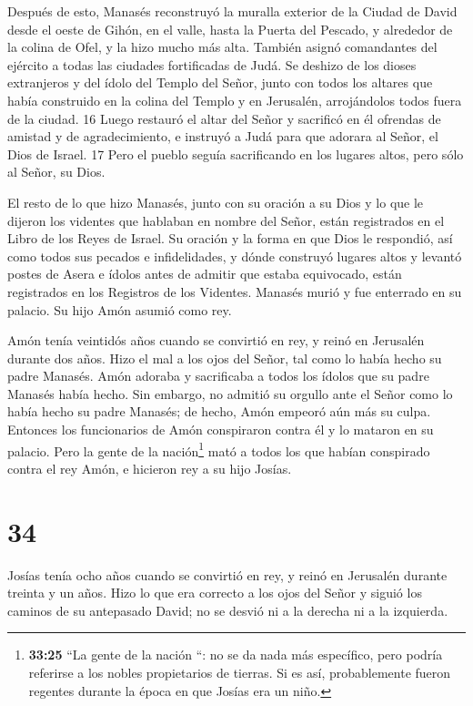  Después de esto, Manasés reconstruyó la muralla exterior
de la Ciudad de David desde el oeste de Gihón, en el valle, hasta la
Puerta del Pescado, y alrededor de la colina de Ofel, y la hizo mucho
más alta. También asignó comandantes del ejército a todas las ciudades
fortificadas de Judá.  Se deshizo de los dioses extranjeros
y del ídolo del Templo del Señor, junto con todos los altares que había
construido en la colina del Templo y en Jerusalén, arrojándolos todos
fuera de la ciudad. 16 Luego restauró el altar del Señor y sacrificó en
él ofrendas de amistad y de agradecimiento, e instruyó a Judá para que
adorara al Señor, el Dios de Israel. 17 Pero el pueblo seguía
sacrificando en los lugares altos, pero sólo al Señor, su Dios.

 El resto de lo que hizo Manasés, junto con su oración a su
Dios y lo que le dijeron los videntes que hablaban en nombre del Señor,
están registrados en el Libro de los Reyes de Israel.  Su
oración y la forma en que Dios le respondió, así como todos sus pecados
e infidelidades, y dónde construyó lugares altos y levantó postes de
Asera e ídolos antes de admitir que estaba equivocado, están registrados
en los Registros de los Videntes.  Manasés murió y fue
enterrado en su palacio. Su hijo Amón asumió como rey.

 Amón tenía veintidós años cuando se convirtió en rey, y
reinó en Jerusalén durante dos años.  Hizo el mal a los
ojos del Señor, tal como lo había hecho su padre Manasés. Amón adoraba y
sacrificaba a todos los ídolos que su padre Manasés había hecho.
 Sin embargo, no admitió su orgullo ante el Señor como lo
había hecho su padre Manasés; de hecho, Amón empeoró aún más su culpa.
 Entonces los funcionarios de Amón conspiraron contra él y
lo mataron en su palacio.  Pero la gente de la
nación\footnote{\textbf{33:25} ``La gente de la nación ``: no se da nada
  más específico, pero podría referirse a los nobles propietarios de
  tierras. Si es así, probablemente fueron regentes durante la época en
  que Josías era un niño.} mató a todos los que habían conspirado contra
el rey Amón, e hicieron rey a su hijo Josías.

\hypertarget{section-33}{%
\section{34}\label{section-33}}

 Josías tenía ocho años cuando se convirtió en rey, y reinó
en Jerusalén durante treinta y un años.  Hizo lo que era
correcto a los ojos del Señor y siguió los caminos de su antepasado
David; no se desvió ni a la derecha ni a la izquierda.

